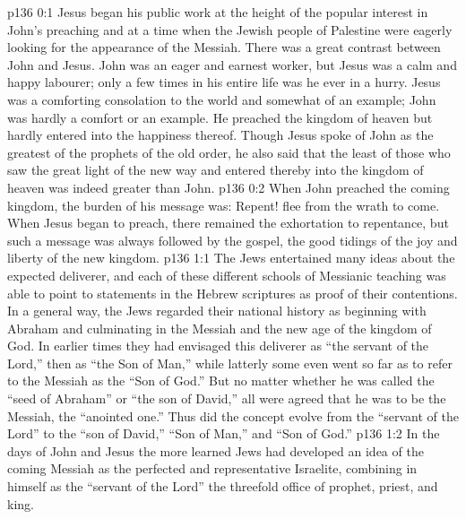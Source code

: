 \author{Midwayer Commission}
\vs p136 0:1 Jesus began his public work at the height of the popular interest in John’s preaching and at a time when the Jewish people of Palestine were eagerly looking for the appearance of the Messiah. There was a great contrast between John and Jesus. John was an eager and earnest worker, but Jesus was a calm and happy labourer; only a few times in his entire life was he ever in a hurry. Jesus was a comforting consolation to the world and somewhat of an example; John was hardly a comfort or an example. He preached the kingdom of heaven but hardly entered into the happiness thereof. Though Jesus spoke of John as the greatest of the prophets of the old order, he also said that the least of those who saw the great light of the new way and entered thereby into the kingdom of heaven was indeed greater than John.
\vs p136 0:2 When John preached the coming kingdom, the burden of his message was: Repent! flee from the wrath to come. When Jesus began to preach, there remained the exhortation to repentance, but such a message was always followed by the gospel, the good tidings of the joy and liberty of the new kingdom.
\vs p136 1:1 The Jews entertained many ideas about the expected deliverer, and each of these different schools of Messianic teaching was able to point to statements in the Hebrew scriptures as proof of their contentions. In a general way, the Jews regarded their national history as beginning with Abraham and culminating in the Messiah and the new age of the kingdom of God. In earlier times they had envisaged this deliverer as “the servant of the Lord,” then as “the Son of Man,” while latterly some even went so far as to refer to the Messiah as the “Son of God.” But no matter whether he was called the “seed of Abraham” or “the son of David,” all were agreed that he was to be the Messiah, the “anointed one.” Thus did the concept evolve from the “servant of the Lord” to the “son of David,” “Son of Man,” and “Son of God.”
\vs p136 1:2 In the days of John and Jesus the more learned Jews had developed an idea of the coming Messiah as the perfected and representative Israelite, combining in himself as the “servant of the Lord” the threefold office of prophet, priest, and king.
